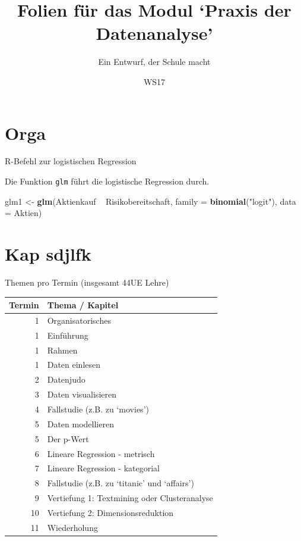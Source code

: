 \documentclass[10pt,ngerman,ignorenonframetext,]{beamer}
\title{Folien für das Modul \newline `Praxis der Datenanalyse'}
\subtitle{Ein Entwurf, der Schule macht}
\institute{FOM}
\date{WS17}
\newenvironment{Shaded}{\begin{snugshade}}{\end{snugshade}}
\newcommand{\KeywordTok}[1]{\textcolor[rgb]{0.13,0.29,0.53}{\textbf{{#1}}}}
\newcommand{\DataTypeTok}[1]{\textcolor[rgb]{0.13,0.29,0.53}{{#1}}}
\newcommand{\StringTok}[1]{\textcolor[rgb]{0.31,0.60,0.02}{{#1}}}
\newcommand{\NormalTok}[1]{{#1}}
\begin{document}
\frame{\titlepage}

\section{Orga}\label{orga}

\begin{frame}[fragile]{R-Befehl zur logistischen Regression}

Die Funktion \texttt{glm} führt die logistische Regression durch.

\begin{Shaded}
\begin{Highlighting}[]
\NormalTok{glm1 <-}\StringTok{ }\KeywordTok{glm}\NormalTok{(Aktienkauf ~}\StringTok{ }\NormalTok{Risikobereitschaft, }
            \DataTypeTok{family =} \KeywordTok{binomial}\NormalTok{(}\StringTok{"logit"}\NormalTok{),}
            \DataTypeTok{data =} \NormalTok{Aktien)}
\end{Highlighting}
\end{Shaded}

\end{frame}

\section{Kap sdjlfk}\label{kap-sdjlfk}

\begin{frame}{Themen pro Termin (insgesamt 44UE Lehre)}

\begin{longtable}[]{@{}rl@{}}
\toprule
Termin & Thema / Kapitel\tabularnewline
\midrule
\endhead
1 & Organisatorisches\tabularnewline
1 & Einführung\tabularnewline
1 & Rahmen\tabularnewline
1 & Daten einlesen\tabularnewline
2 & Datenjudo\tabularnewline
3 & Daten visualisieren\tabularnewline
4 & Fallstudie (z.B. zu `movies')\tabularnewline
5 & Daten modellieren\tabularnewline
5 & Der p-Wert\tabularnewline
6 & Lineare Regression - metrisch\tabularnewline
7 & Lineare Regression - kategorial\tabularnewline
8 & Fallstudie (z.B. zu `titanic' und `affairs')\tabularnewline
9 & Vertiefung 1: Textmining oder Clusteranalyse\tabularnewline
10 & Vertiefung 2: Dimensionsreduktion\tabularnewline
11 & Wiederholung\tabularnewline
\bottomrule
\end{longtable}

\end{frame}
\end{document}
